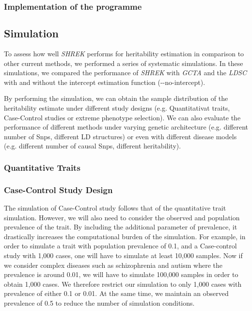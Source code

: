 \subsubsection{Implementation of the programme}
\subsection{Simulation}
To assess how well \textit{SHREK} performs for heritability estimation in comparison to other current methods, we performed a series of systematic simulations.
In these simulations, we compared the performance of \textit{SHREK} with \textit{GCTA}\cite{Yang2011} and the \textit{LDSC}\cite{Bulik-Sullivan2015} with and without the intercept estimation function (-{}-no-intercept). 

By performing the simulation, we can obtain the sample distribution of the heritability estimate under different study designs (e.g. Quantitativat traits, Case-Control studies or extreme phenotype selection). 
We can also evaluate the performance of different methods under varying genetic architecture (e.g. different number of Snps, different LD structures) or even with different disease models (e.g. different number of causal Snps, different heritability).

\subsubsection{Quantitative Traits}

\subsubsection{Case-Control Study Design}
The simulation of Case-Control study follows that of the quantitative trait simulation.
However, we will also need to consider the observed and population prevalence of the trait.
By including the additional parameter of prevalence, it drastically increases the computational burden of the simulation.
For example, in order to simulate a trait with population prevalence of 0.1, and a Case-control study with 1,000 cases, one will have to simulate at least 10,000 samples. 
Now if we consider complex diseases such as schizophrenia and autism where the prevalence is around 0.01, we will have to simulate 100,000 samples in order to obtain 1,000 cases. 
We therefore restrict our simulation to only 1,000 cases with prevalence of either 0.1 or 0.01. 
At the same time, we maintain an observed prevalence of 0.5 to reduce the number of simulation conditions.


